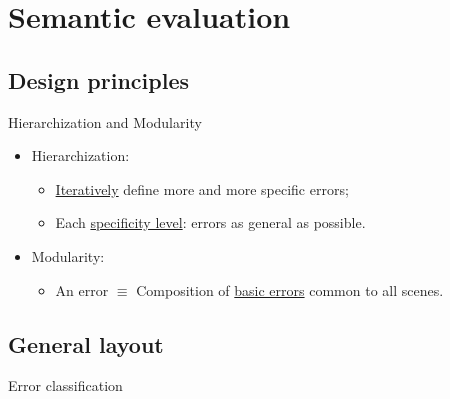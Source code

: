 \documentclass[12pt]{beamer}
\begin{document}
    \section{Semantic evaluation}
        \subsection{Design principles}
            \begin{frame}{Hierarchization and Modularity}
                \begin{itemize}[label=\(\blacktriangleright\), font=\color{IGNGreen}, itemsep=2em]
                    \item<1-> Hierarchization:
                        \begin{itemize}[label=\(\blacktriangleright\), font=\color{IGNGreen}]
                            \item<2-> \underline{Iteratively} define more and more specific errors;
                            \item<3-> Each \underline{specificity level}: errors as general as possible.
                        \end{itemize}
                    \item<4-> Modularity:
                        \begin{itemize}[label=\(\blacktriangleright\), font=\color{IGNGreen}]
                            \item<5-> An error \(\equiv\) Composition of \underline{basic errors} common to all scenes.
                        \end{itemize}
                \end{itemize}
            \end{frame}
        
        \subsection{General layout}
            \begin{frame}{Error classification}
                
            \end{frame}
\end{document}
